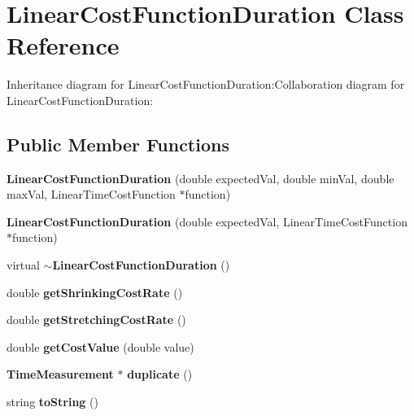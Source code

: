 \section{LinearCostFunctionDuration Class Reference}
\label{classbr_1_1pucrio_1_1telemidia_1_1ginga_1_1ncl_1_1model_1_1time_1_1LinearCostFunctionDuration}
Inheritance diagram for LinearCostFunctionDuration:Collaboration diagram for LinearCostFunctionDuration:\subsection*{Public Member Functions}
\begin{CompactItemize}
\item 
\textbf{LinearCostFunctionDuration} (double expectedVal, double minVal, double maxVal, LinearTimeCostFunction $\ast$function)\label{classbr_1_1pucrio_1_1telemidia_1_1ginga_1_1ncl_1_1model_1_1time_1_1LinearCostFunctionDuration_b5bf2d157a6de2dd9ea73bb6638bb8a7}

\item 
\textbf{LinearCostFunctionDuration} (double expectedVal, LinearTimeCostFunction $\ast$function)\label{classbr_1_1pucrio_1_1telemidia_1_1ginga_1_1ncl_1_1model_1_1time_1_1LinearCostFunctionDuration_d3d5b485bece3bf4973851644eba343a}

\item 
virtual {\bf $\sim$LinearCostFunctionDuration} ()\label{classbr_1_1pucrio_1_1telemidia_1_1ginga_1_1ncl_1_1model_1_1time_1_1LinearCostFunctionDuration_0fa3d1da6df531199c1a43eff835a3b5}

\item 
double \textbf{getShrinkingCostRate} ()\label{classbr_1_1pucrio_1_1telemidia_1_1ginga_1_1ncl_1_1model_1_1time_1_1LinearCostFunctionDuration_0f97fa026a06da17f812d9a150570a74}

\item 
double \textbf{getStretchingCostRate} ()\label{classbr_1_1pucrio_1_1telemidia_1_1ginga_1_1ncl_1_1model_1_1time_1_1LinearCostFunctionDuration_e5b599801998641f566b11cd7a00fb6b}

\item 
double \textbf{getCostValue} (double value)\label{classbr_1_1pucrio_1_1telemidia_1_1ginga_1_1ncl_1_1model_1_1time_1_1LinearCostFunctionDuration_52480ce5bec97d8c243f69b6fc348949}

\item 
{\bf TimeMeasurement} $\ast$ \textbf{duplicate} ()\label{classbr_1_1pucrio_1_1telemidia_1_1ginga_1_1ncl_1_1model_1_1time_1_1LinearCostFunctionDuration_b9566409330fc24ebd73cbccd476c3fa}

\item 
string \textbf{toString} ()\label{classbr_1_1pucrio_1_1telemidia_1_1ginga_1_1ncl_1_1model_1_1time_1_1LinearCostFunctionDuration_2a35b0d68ef09ad99a22fa8563e1797f}

\end{CompactItemize}


